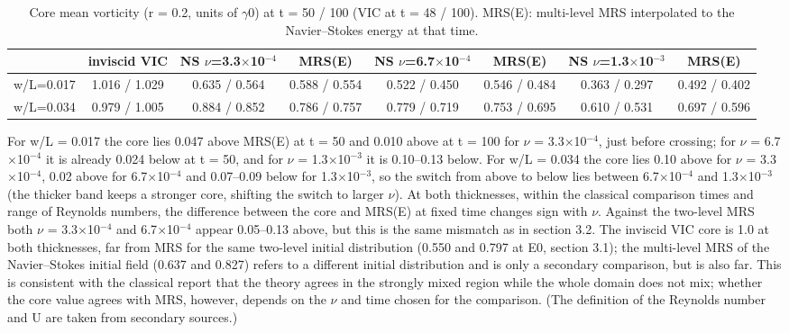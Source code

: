 \documentclass[11pt]{article}
\begin{document}
\begin{table}[t]\centering\caption{Core mean vorticity (r = 0.2, units of $\gamma{}$0) at t = 50 / 100 (VIC at t = 48 / 100). MRS(E): multi-level MRS interpolated to the Navier--Stokes energy at that time.}\label{tab1}\scriptsize\setlength{\tabcolsep}{3pt}\begin{tabular}{lccccccc}\hline
 & inviscid VIC & NS $\nu{}$=3.3$\times{}$10$^{-4}$ & MRS(E) & NS $\nu{}$=6.7$\times{}$10$^{-4}$ & MRS(E) & NS $\nu{}$=1.3$\times{}$10$^{-3}$ & MRS(E) \\\hline
w/L=0.017 & 1.016 / 1.029 & 0.635 / 0.564 & 0.588 / 0.554 & 0.522 / 0.450 & 0.546 / 0.484 & 0.363 / 0.297 & 0.492 / 0.402 \\
w/L=0.034 & 0.979 / 1.005 & 0.884 / 0.852 & 0.786 / 0.757 & 0.779 / 0.719 & 0.753 / 0.695 & 0.610 / 0.531 & 0.697 / 0.596 \\
\hline\end{tabular}\end{table}

For w/L = 0.017 the core lies 0.047 above MRS(E) at t = 50 and 0.010 above at t = 100 for $\nu{}$ = 3.3$\times{}$10$^{-4}$, just before crossing; for $\nu{}$ = 6.7$\times{}$10$^{-4}$ it is already 0.024 below at t = 50, and for $\nu{}$ = 1.3$\times{}$10$^{-3}$ it is 0.10--0.13 below. For w/L = 0.034 the core lies 0.10 above for $\nu{}$ = 3.3$\times{}$10$^{-4}$, 0.02 above for 6.7$\times{}$10$^{-4}$ and 0.07--0.09 below for 1.3$\times{}$10$^{-3}$, so the switch from above to below lies between 6.7$\times{}$10$^{-4}$ and 1.3$\times{}$10$^{-3}$ (the thicker band keeps a stronger core, shifting the switch to larger $\nu{}$). At both thicknesses, within the classical comparison times and range of Reynolds numbers, the difference between the core and MRS(E) at fixed time changes sign with $\nu{}$. Against the two-level MRS both $\nu{}$ = 3.3$\times{}$10$^{-4}$ and 6.7$\times{}$10$^{-4}$ appear 0.05--0.13 above, but this is the same mismatch as in section 3.2. The inviscid VIC core is 1.0 at both thicknesses, far from MRS for the same two-level initial distribution (0.550 and 0.797 at E0, section 3.1); the multi-level MRS of the Navier--Stokes initial field (0.637 and 0.827) refers to a different initial distribution and is only a secondary comparison, but is also far. This is consistent with the classical report that the theory agrees in the strongly mixed region while the whole domain does not mix; whether the core value agrees with MRS, however, depends on the $\nu{}$ and time chosen for the comparison. (The definition of the Reynolds number and U are taken from secondary sources.)
\end{document}
